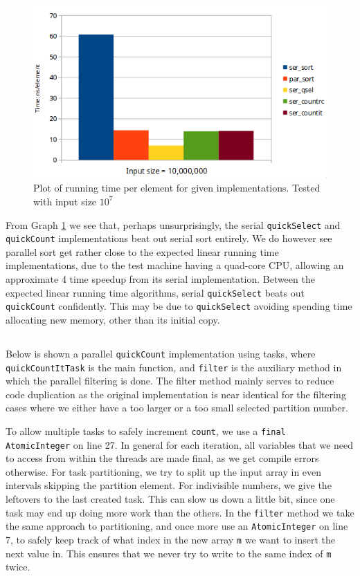 \documentclass[a5paper]{article}
\begin{document}
\begin{figure}[!ht]
    \centering
    \noindent\includegraphics[scale=0.5]{res/graph_q1.png}
    \caption{Plot of running time per element for given implementations. Tested with input size $10^7$}
    \label{fig:graphq1}
\end{figure}

From Graph \ref{fig:graphq1} we see that, perhaps unsurprisingly, the serial \texttt{quickSelect} and \texttt{quickCount} implementations beat out serial sort entirely.
We do however see parallel sort get rather close to the expected linear running time implementations, due to the test machine having a quad-core CPU,
allowing an approximate 4 time speedup from its serial implementation. Between the expected linear running time algorithms, serial \texttt{quickSelect} beats out \texttt{quickCount} confidently. This may be due to \texttt{quickSelect} avoiding spending time allocating new memory, other than its initial copy.

\subsection{}
Below is shown a parallel \texttt{quickCount} implementation using tasks, where \texttt{quickCountItTask} is the main function, and \texttt{filter} is the auxiliary method
in which the parallel filtering is done. The filter method mainly serves to reduce code duplication as the original implementation is near identical
for the filtering cases where we either have a too larger or a too small selected partition number.

To allow multiple tasks to safely increment \texttt{count}, we use a \texttt{final AtomicInteger} on line 27. In general for each iteration, all variables that we need to access
from within the threads are made final, as we get compile errors otherwise. For task partitioning, we try to split up the input array in even intervals skipping the partition element. For indivisible numbers,
we give the leftovers to the last created task. This can slow us down a little bit, since one task may end up doing more work than the others. In the \texttt{filter} method we take the same
approach to partitioning, and once more use an \texttt{AtomicInteger} on line 7, to safely keep track of what index in the new array \texttt{m} we want to insert the next value in. This ensures that
we never try to write to the same index of \texttt{m} twice.
\end{document}
